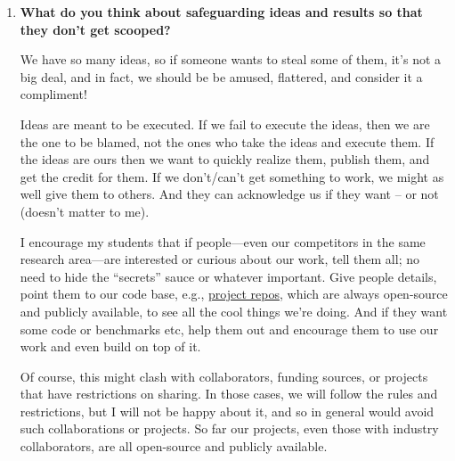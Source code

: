 \documentclass{article}
\begin{document}
\begin{enumerate}[label=\arabic*.]
    \item\label{q:scooping} \textbf{What do you think about safeguarding ideas and results so that they don't get scooped?}
    
    We have so many ideas, so if someone wants to steal some of them, it's not a big deal, and in fact, we should be be amused, flattered, and consider it a compliment! 

    Ideas are meant to be executed. If we fail to execute the ideas, then we are the one to be blamed, not the ones who take the ideas and execute them.  If the ideas are ours then we want to quickly realize them, publish them, and get the credit for them. If we don't/can't get something to work, we might as well give them to others.  And they can acknowledge us if they want -- or not (doesn't matter to me).  

    I encourage my students that if people---even our competitors in the same research area---are interested or curious about our work, tell them all; no need to hide the ``secrets'' sauce or whatever important. Give people details, point them to our code base, e.g., \href{https://code.roars.dev}{project repos}, which are always open-source and publicly available, to see all the cool things we're doing. And if they want some code or benchmarks etc, help them out and encourage them to use our work and even build on top of it.

    Of course, this might clash with collaborators, funding sources, or projects that have restrictions on sharing. In those cases, we will follow the rules and restrictions, but I will not be happy about it, and so in general would avoid such collaborations or projects. So far our projects, even those with industry collaborators, are all open-source and publicly available.

       
    





\end{enumerate}
\end{document}
